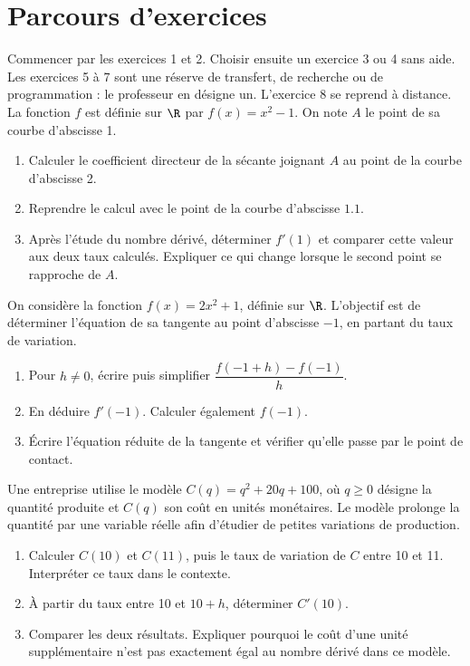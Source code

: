 \section*{Parcours d’exercices}\label{C04-PARC}
Commencer par les exercices 1 et 2. Choisir ensuite un exercice 3 ou 4 sans aide. Les exercices 5 à 7 sont une réserve de transfert, de recherche ou de programmation : le professeur en désigne un. L’exercice 8 se reprend à distance.
\begingroup
{}
La fonction $f$ est définie sur $\R$ par $f(x)=x^2-1$. On note $A$ le point de sa courbe d’abscisse 1.
\begin{enumerate}[label=\arabic*.]
\item Calculer le coefficient directeur de la sécante joignant $A$ au point de la courbe d’abscisse 2.
\item Reprendre le calcul avec le point de la courbe d’abscisse $\num{1,1}$.
\item Après l’étude du nombre dérivé, déterminer $f\prime(1)$ et comparer cette valeur aux deux taux calculés. Expliquer ce qui change lorsque le second point se rapproche de $A$.
\end{enumerate}
On considère la fonction $f(x)=2x^2+1$, définie sur $\R$. L’objectif est de déterminer l’équation de sa tangente au point d’abscisse $-1$, en partant du taux de variation.
\begin{enumerate}[label=\arabic*.]
\item Pour $h\ne0$, écrire puis simplifier $\dfrac{f(-1+h)-f(-1)}{h}$.
\item En déduire $f\prime(-1)$. Calculer également $f(-1)$.
\item Écrire l’équation réduite de la tangente et vérifier qu’elle passe par le point de contact.
\end{enumerate}
Une entreprise utilise le modèle $C(q)=q^2+20q+100$, où $q\geq0$ désigne la quantité produite et $C(q)$ son coût en unités monétaires. Le modèle prolonge la quantité par une variable réelle afin d’étudier de petites variations de production.
\begin{enumerate}[label=\arabic*.]
\item Calculer $C(10)$ et $C(11)$, puis le taux de variation de $C$ entre 10 et 11. Interpréter ce taux dans le contexte.
\item À partir du taux entre 10 et $10+h$, déterminer $C\prime(10)$.
\item Comparer les deux résultats. Expliquer pourquoi le coût d’une unité supplémentaire n’est pas exactement égal au nombre dérivé dans ce modèle.
\end{enumerate}
